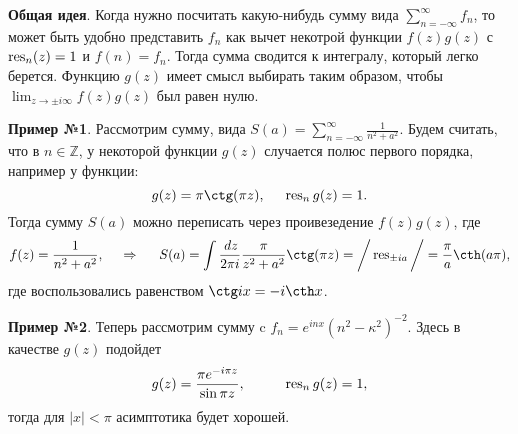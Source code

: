 \textbf{Общая идея}. Когда нужно посчитать какую-нибудь сумму вида $\sum_{n=-\infty}^{\infty} f_n$, то может быть удобно представить $f_n$ как вычет некотрой функции $f(z) g(z)$ с $\mathop{\mathrm{res}}\nolimits_n (z) = 1$ и $f(n) = f_n$. Тогда сумма сводится к интегралу, который легко берется. Функцию $g(z)$ имеет смысл выбирать таким образом, чтобы $\lim_{z \to \pm i\infty} f(z) g(z)$ был равен нулю.

\textbf{Пример №1}.
Рассмотрим сумму, вида $S(a) = \sum_{n=-\infty}^{\infty}  \frac{1}{n^2 + a^2}.$
Будем считать, что в $n \in \mathbb{Z}$, у некоторой функции $g(z)$ случается полюс первого порядка, например у функции:
\begin{equation*}
    g(z) = \pi \ctg(\pi z), 
    \hspace{5 mm} \res_n g(z) = 1.
\end{equation*}
Тогда сумму $S(a)$ можно переписать через проивезедение $f(z) g(z)$, где 
\begin{equation*}
    f(z) = \frac{1}{n^2 + a^2},
    \hspace{0.5cm} \Rightarrow \hspace{0.5cm}
    S(a) = \int \frac{\d z}{2 \pi i} \frac{\pi}{z^2 + a^2} \ctg (\pi z) = 
    \bigg/
        \res_{\pm ia}
    \bigg/ = \frac{\pi}{a} \cth (a \pi),
\end{equation*}
где воспользовались равенством $\ctg i x = - i \cth x$.


\textbf{Пример №2}. Теперь рассмотрим сумму c $f_n = e^{inx} (n^2 - \kappa^2)^{-2}$. Здесь в качестве $g(z)$ подойдет
\begin{equation*}
    g(z) = \frac{\pi e^{-i \pi z}}{\sin \pi z},
    \hspace{10 mm} 
    \res_n g(z) = 1,
\end{equation*}
тогда для $|x| < \pi$ асимптотика будет хорошей. 
